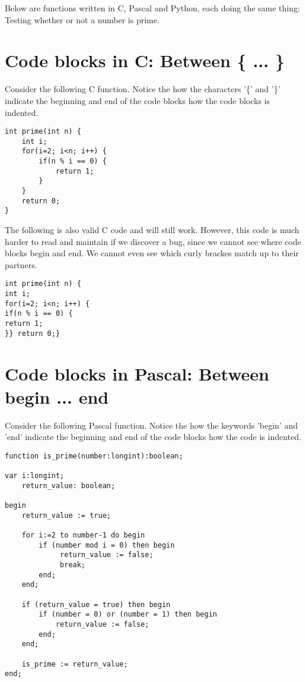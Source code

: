 \documentclass{report}
\begin{document}
Below are functions written in C, Pascal and Python, each doing the same
thing: Testing whether or not a number is prime.

\section{Code blocks in C: Between \{ ...
\}}\label{code-blocks-in-c-between-...}

Consider the following C function. Notice the how the characters '\{'
and '\}' indicate the beginning and end of the code blocks how the code
blocks is indented.

\begin{verbatim}
int prime(int n) {
    int i;
    for(i=2; i<n; i++) {
        if(n % i == 0) {
            return 1;   
        }
    }
    return 0;
}
\end{verbatim}

The following is also valid C code and will still work. However, this
code is much harder to read and maintain if we discover a bug, since we
cannot see where code blocks begin and end. We cannot even see which
curly brackes match up to their partners.

\begin{verbatim}
int prime(int n) {
int i;
for(i=2; i<n; i++) {
if(n % i == 0) {
return 1;   
}} return 0;}
\end{verbatim}

\section{Code blocks in Pascal: Between begin ...
end}\label{code-blocks-in-pascal-between-begin-...-end}

Consider the following Pascal function. Notice the how the keywords
'begin' and 'end' indicate the beginning and end of the code blocks how
the code is indented.

\begin{verbatim}
function is_prime(number:longint):boolean;

var i:longint;
    return_value: boolean;
    
begin
    return_value := true;

    for i:=2 to number-1 do begin
        if (number mod i = 0) then begin
             return_value := false;
             break;
        end;
    end;

    if (return_value = true) then begin
        if (number = 0) or (number = 1) then begin        
            return_value := false;
        end;
    end;

    is_prime := return_value;
end;
\end{verbatim}
\end{document}
